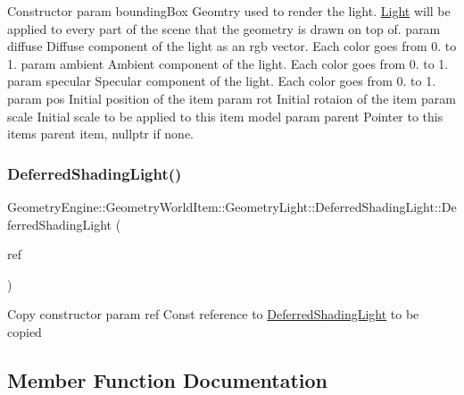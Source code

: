 Constructor param bounding\+Box Geomtry used to render the light. \mbox{\hyperlink{class_geometry_engine_1_1_geometry_world_item_1_1_geometry_light_1_1_light}{Light}} will be applied to every part of the scene that the geometry is drawn on top of. param diffuse Diffuse component of the light as an rgb vector. Each color goes from 0. to 1. param ambient Ambient component of the light. Each color goes from 0. to 1. param specular Specular component of the light. Each color goes from 0. to 1. param pos Initial position of the item param rot Initial rotaion of the item param scale Initial scale to be applied to this item model param parent Pointer to this items parent item, nullptr if none. \mbox{\label{class_geometry_engine_1_1_geometry_world_item_1_1_geometry_light_1_1_deferred_shading_light_a0fd11e2d72e7cc625d9ff63ab5757651}} 
\subsubsection{\texorpdfstring{DeferredShadingLight()}{DeferredShadingLight()}\hspace{0.1cm}{\footnotesize\ttfamily [2/2]}}
{\footnotesize\ttfamily Geometry\+Engine\+::\+Geometry\+World\+Item\+::\+Geometry\+Light\+::\+Deferred\+Shading\+Light\+::\+Deferred\+Shading\+Light (\begin{DoxyParamCaption}\item[{const \mbox{\hyperlink{class_geometry_engine_1_1_geometry_world_item_1_1_geometry_light_1_1_deferred_shading_light}{Deferred\+Shading\+Light}} \&}]{ref }\end{DoxyParamCaption})\hspace{0.3cm}{\ttfamily [inline]}}

Copy constructor param ref Const reference to \mbox{\hyperlink{class_geometry_engine_1_1_geometry_world_item_1_1_geometry_light_1_1_deferred_shading_light}{Deferred\+Shading\+Light}} to be copied 

\subsection{Member Function Documentation}
\mbox{\label{class_geometry_engine_1_1_geometry_world_item_1_1_geometry_light_1_1_deferred_shading_light_a7ef4d7b7a41cbda01a55bcb0475484d3}} 
